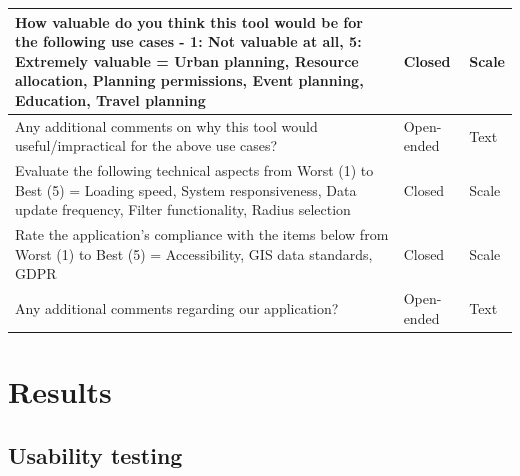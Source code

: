 \documentclass{report}
\begin{document}
\begin{table}[h!]
\begin{tabularx}{\textwidth}{|p{}|X|X|}
        How valuable do you think this tool would be for the following use cases - 1: Not valuable at all, 5: Extremely valuable = Urban planning, Resource allocation, Planning permissions, Event planning, Education, Travel planning & Closed                 & Scale                \\ \hline
        Any additional comments on why this tool would useful/impractical for the above use cases?                                                                                                                                       & Open-ended             & Text                 \\ \hline
        Evaluate the following technical aspects from Worst (1) to Best (5) = Loading speed, System responsiveness, Data update frequency, Filter functionality, Radius selection                                                        & Closed                 & Scale                \\ \hline
        Rate the application's compliance with the items below from Worst (1) to Best (5) = Accessibility, GIS data standards, GDPR                                                                                                      & Closed                 & Scale                \\ \hline
        Any additional comments regarding our application?                                                                                                                                                                               & Open-ended             & Text
    \end{tabularx}
\end{table}

\chapter{Results}
\section{Usability testing}
\end{document}
